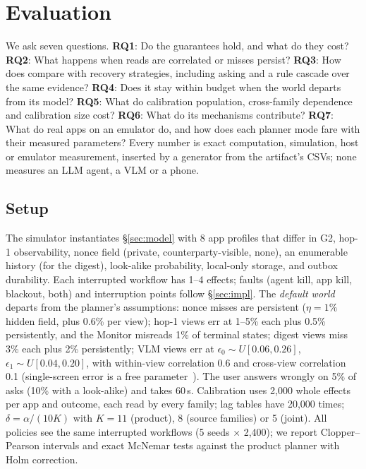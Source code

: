 \section{Evaluation}
\label{sec:eval}

We ask seven questions. \textbf{RQ1}: Do the guarantees hold, and what do they cost? \textbf{RQ2}: What happens when reads are correlated or misses persist?
\textbf{RQ3}: How does \sys compare with recovery strategies, including asking and a rule cascade over the same evidence? \textbf{RQ4}: Does it stay within budget when the world
departs from its model? \textbf{RQ5}: What do calibration population, cross-family dependence and calibration size cost? \textbf{RQ6}: What do its mechanisms contribute? \textbf{RQ7}: What do real apps on an emulator do, and how does each planner mode fare with their measured parameters?
Every number is exact computation, simulation, host or emulator measurement, inserted by a generator from the artifact's CSVs; none measures an LLM agent, a VLM or a phone.

\subsection{Setup}
\label{sec:setup}
 The simulator instantiates \S\ref{sec:model} with 8 app profiles that differ in G2, hop-1 observability, nonce field (private, counterparty-visible,
none), an enumerable history (for the digest), look-alike probability, local-only storage, and outbox durability. Each interrupted workflow has 1--4 effects; faults (agent kill, app
kill, blackout, both) and interruption points follow \S\ref{sec:impl}. The \emph{default world} departs from the planner's assumptions: nonce misses are persistent ($\eta{=}1\%$ hidden
field, plus 0.6\% per view); hop-1 views err at 1--5\% each plus 0.5\% persistently, and the Monitor misreads 1\% of terminal states; digest views miss 3\% each plus 2\% persistently;
VLM views err at $\epsilon_0{\sim}U[0.06,0.26]$, $\epsilon_1{\sim}U[0.04,0.20]$, with within-view correlation 0.6 and cross-view correlation 0.1 (single-screen error is a free
parameter~\cite{pan2024autonomous}). The user answers wrongly on 5\% of asks (10\% with a look-alike) and takes 60\,s. Calibration uses 2{,}000 whole effects per app and outcome, each read by every family; lag tables have 20{,}000 times; $\delta=\alpha/(10K)$
with $K{=}11$ (product), 8 (source families) or 5 (joint). All policies see the same \SimN interrupted workflows (5 seeds $\times$ 2{,}400); we report Clopper--Pearson intervals and exact
McNemar tests against the product planner with Holm correction.

